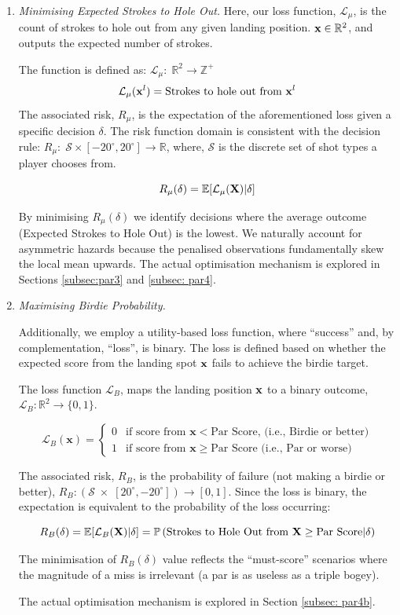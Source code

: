 \documentclass[11pt, letterpaper]{article}
\begin{document}
\begin{enumerate}
    \item \textit{Minimising Expected Strokes to Hole Out.} Here, our loss function, $\mathcal{L}_\mu$,  is the count of strokes to hole out from any given landing position. $ \mathbf{x} \in \mathbb{R}^2$, and outputs the expected number of strokes.

    The function is defined as: $\mathcal{L}_{\mu}:\; \mathbb{R}^2 \to \mathbb{Z}^+$
    $$\mathcal{L}_\mu(\mathbf{x}^l)= \text{Strokes to hole out from }\mathbf{x}^l$$
    The associated risk, $R_{\mu}$, is the expectation of the aforementioned loss given a specific decision $\delta$. The risk function domain is consistent with the decision rule:  $R_{\mu}:\; \mathcal{S} \times [-20^\circ, 20 ^\circ]\to \mathbb{R}$, where, $\mathcal{S}$ is the discrete set of shot types a player chooses from.

    $$R_{\mu}(\delta) = \mathbb{E}[\mathcal{L}_\mu(\mathbf{X}) | \delta]$$
    
    By minimising $R_{\mu} (\delta)$ we identify decisions where the average outcome (Expected Strokes to Hole Out) is the lowest. We naturally account for asymmetric hazards because the penalised observations fundamentally skew the local mean upwards. The actual optimisation mechanism is explored in Sections \ref{subsec:par3} and \ref{subsec: par4}.

    \item \textit{Maximising Birdie Probability.} 
    
    Additionally, we employ a utility-based loss function, where ``success'' and, by complementation, ``loss'', is binary. The loss is defined based on whether the expected score from the landing spot $\mathbf{x}$ fails to achieve the birdie target. 

    The loss function $\mathcal{L}_B$, maps the landing position $\mathbf{x}$ to a binary outcome, $\mathcal{L}_B: \mathbb{R}^2 \to \{0,1\}$.

    $$\mathcal{L}_B(\mathbf{x}) = \begin{cases} 0 & \text{if } \text{score from } \mathbf{x} < \text{Par Score, (i.e., Birdie or better)} \\ 1 & \text{if } \text{score from } \mathbf{x} \ge \text{Par Score (i.e., Par or worse)} \end{cases}$$

    The associated risk, $R_B$, is the probability of failure (not making a birdie or better), $R_B: (\mathcal{S} \;\times \;[20^\circ, -20^\circ]) \to [0,1]$. Since the loss is binary, the expectation is equivalent to the probability of the loss occurring: 
    
    $$R_B(\delta) = \mathbb{E}[\mathcal{L}_B(\mathbf{X})|\delta] = \mathbb{P}\left(\text{Strokes to Hole Out from } \mathbf{X} \geq \text{Par Score} | \delta \right)$$
    
    The minimisation of $R_B(\delta)$ value reflects the ``must-score'' scenarios where the magnitude of a miss is irrelevant (a par is as useless as a triple bogey). 

     The actual optimisation mechanism is explored in Section \ref{subsec: par4b}.
\end{enumerate}
\end{document}
